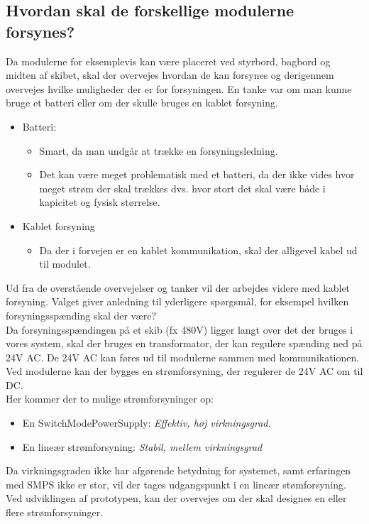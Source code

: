 \subsection{Hvordan skal de forskellige modulerne forsynes?}
Da modulerne for eksemplevis kan være placeret ved styrbord, bagbord og midten af skibet, skal der overvejes hvordan de kan forsynes og derigennem overvejes hvilke muligheder der er for forsyningen.
En tanke var om man kunne bruge et batteri eller om der skulle bruges en kablet forsyning.
\begin{itemize}
\item Batteri:
	\begin{itemize}
	\item Smart, da man undgår at trække en forsyningsledning.
	\item Det kan være meget problematisk med et batteri, da der ikke vides hvor meget strøm der skal trækkes dvs. hvor stort det skal være både i kapicitet og fysisk størrelse. \\
	\end{itemize}
\item Kablet forsyning \\
\begin{itemize}
\item Da der i forvejen er en kablet kommunikation, skal der alligevel kabel ud til modulet.\\
\end{itemize}
\end{itemize}
Ud fra de overstående overvejelser og tanker vil der arbejdes videre med kablet forsyning.
Valget giver anledning til yderligere spørgsmål, for eksempel hvilken forsyningsspænding skal der være?\\
Da forsyningsspændingen på et skib (fx 480V) ligger langt over det der bruges i vores system, skal der bruges en transformator, der kan regulere spænding ned på 24V AC. De 24V AC kan føres ud til modulerne sammen med kommunikationen. \\
Ved modulerne kan der bygges en strømforsyning, der regulerer de 24V AC om til DC. \\
Her kommer der to mulige strømforsyninger op:
\begin{itemize}
\item En SwitchModePowerSupply: \textit{Effektiv, høj virkningsgrad.}
\item En lineær strømforsyning: \textit{Stabil, mellem virkningsgrad}
\end{itemize}
Da virkningsgraden ikke har afgørende betydning for systemet, samt erfaringen med SMPS ikke er stor, vil der tages udgangspunkt i en lineær stømforsyning.\\
Ved udviklingen af prototypen, kan der overvejes om der skal designes en eller flere strømforsyninger.


